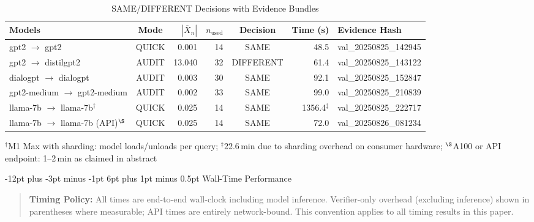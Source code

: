 \documentclass[11pt]{article}
\makeatletter
\renewcommand\subsection{\@startsection{subsection}{2}{\z@}%
  {-12pt plus -3pt minus -1pt}%
  {6pt plus 1pt minus 0.5pt}%
  {\normalfont\large\bfseries}}
\makeatother
\begin{document}
\begin{table}[ht!]
\centering
\caption{SAME/DIFFERENT Decisions with Evidence Bundles}
\label{tab:decisions}
\small
\begin{tabular}{@{}l c r r c r l@{}}
\toprule
\textbf{Models} & \textbf{Mode} & \textbf{$|\overline{X}_n|$} & \textbf{$n_{\text{used}}$} & \textbf{Decision} & \textbf{Time (s)} & \textbf{Evidence Hash} \\
\midrule
gpt2 $\to$ gpt2 & QUICK & 0.001 & 14 & SAME & 48.5 & val\_20250825\_142945 \\
gpt2 $\to$ distilgpt2 & AUDIT & 13.040 & 32 & DIFFERENT & 61.4 & val\_20250825\_143122 \\
dialogpt $\to$ dialogpt & AUDIT & 0.003 & 30 & SAME & 92.1 & val\_20250825\_152847 \\
gpt2-medium $\to$ gpt2-medium & AUDIT & 0.002 & 33 & SAME & 99.0 & val\_20250825\_210839 \\
llama-7b $\to$ llama-7b$^{\dagger}$ & QUICK & 0.025 & 14 & SAME & 1356.4$^{\ddagger}$ & val\_20250825\_222717 \\
llama-7b $\to$ llama-7b (API)$^{\S}$ & QUICK & 0.025 & 14 & SAME & 72.0 & val\_20250826\_081234 \\
\bottomrule
\end{tabular}

\vspace{3pt}
\footnotesize{$^{\dagger}$M1 Max with sharding: model loads/unloads per query; $^{\ddagger}$22.6\,min due to sharding overhead on consumer hardware; $^{\S}$A100 or API endpoint: 1--2\,min as claimed in abstract}
\end{table}

\subsection{Wall-Time Performance}

\begin{quote}
\footnotesize
\textbf{Timing Policy:} All times are end-to-end wall-clock including model inference. Verifier-only overhead (excluding inference) shown in parentheses where measurable; API times are entirely network-bound. This convention applies to all timing results in this paper.
\end{quote}
\end{document}

